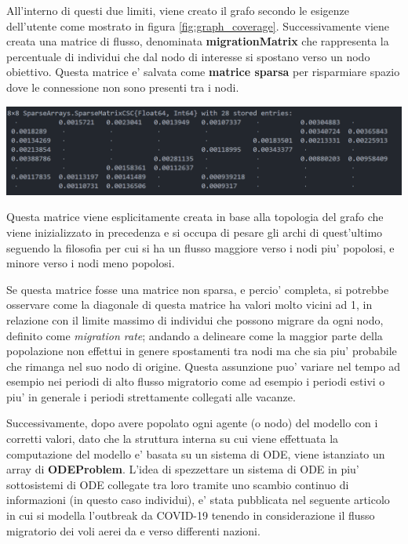 All'interno di questi due limiti, viene creato il grafo secondo le esigenze dell'utente come mostrato 
in figura \ref{fig:graph_coverage}.
Successivamente viene creata una matrice di flusso, denominata \textbf{migrationMatrix}
che rappresenta la percentuale di individui che dal nodo di interesse si spostano verso 
un nodo obiettivo. Questa matrice e' salvata come \textbf{matrice sparsa} per risparmiare
spazio dove le connessione non sono presenti tra i nodi. 

\begin{minipage}{\linewidth}
	\centering
	\includegraphics[width=\textwidth]{img/migrationMatrix.png}
	\label{fig:migration matrix}
\end{minipage}

Questa matrice viene esplicitamente creata in base alla topologia del grafo che viene 
inizializzato in precedenza e si occupa di pesare gli archi di quest'ultimo seguendo la 
filosofia per cui si ha un flusso maggiore verso i nodi piu' popolosi, e minore verso i 
nodi meno popolosi. 

Se questa matrice fosse una matrice non sparsa, e percio' completa, si potrebbe osservare
come la diagonale di questa matrice ha valori molto vicini ad 1, in relazione con il limite
massimo di individui che possono migrare da ogni nodo, definito come \emph{migration rate}; 
andando a delineare come la maggior parte della popolazione non effettui in genere spostamenti 
tra nodi ma che sia piu' probabile che rimanga nel suo nodo di origine. Questa assunzione puo' 
variare nel tempo ad esempio nei periodi di alto flusso migratorio come ad esempio i periodi 
estivi o piu' in generale i periodi strettamente collegati alle vacanze.

Successivamente, dopo avere popolato ogni agente (o nodo) del modello con i corretti valori,
dato che la struttura interna su cui viene effettuata la computazione del modello e' basata su 
un sistema di ODE, viene istanziato un array di \textbf{ODEProblem}. L'idea di spezzettare
un sistema di ODE in piu' sottosistemi di ODE collegate tra loro tramite uno scambio continuo 
di informazioni (in questo caso individui), e' stata pubblicata nel seguente articolo \cite{Ding2021}
in cui si modella l'outbreak da COVID-19 tenendo in considerazione il flusso migratorio 
dei voli aerei da e verso differenti nazioni. 


